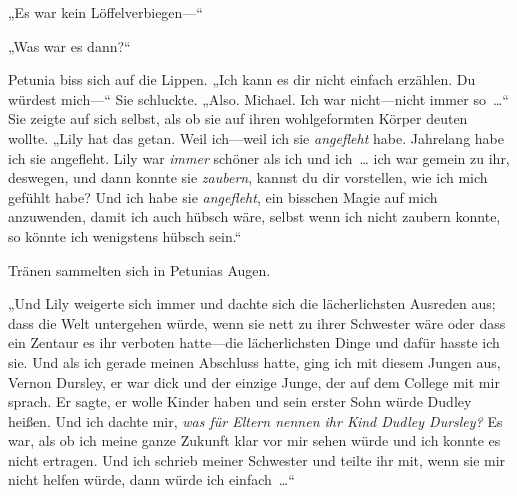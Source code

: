 „Es war kein Löffelverbiegen—“

„Was war es dann?“

Petunia biss sich auf die Lippen. „Ich kann es dir nicht einfach erzählen. Du würdest mich—“ Sie schluckte. „Also. Michael. Ich war nicht—nicht immer so …“ Sie zeigte auf sich selbst, als ob sie auf ihren wohlgeformten Körper deuten wollte. „Lily hat das getan. Weil ich—weil ich sie \emph{angefleht} habe. Jahrelang habe ich sie angefleht. Lily war \emph{immer} schöner als ich und ich … ich war gemein zu ihr, deswegen, und dann konnte sie \emph{zaubern}, kannst du dir vorstellen, wie ich mich gefühlt habe? Und ich habe sie \emph{angefleht}, ein bisschen Magie auf mich anzuwenden, damit ich auch hübsch wäre, selbst wenn ich nicht zaubern konnte, so könnte ich wenigstens hübsch sein.“

Tränen sammelten sich in Petunias Augen.

„Und Lily weigerte sich immer und dachte sich die lächerlichsten Ausreden aus; dass die Welt untergehen würde, wenn sie nett zu ihrer Schwester wäre oder dass ein Zentaur es ihr verboten hatte—die lächerlichsten Dinge und dafür hasste ich sie. Und als ich gerade meinen Abschluss hatte, ging ich mit diesem Jungen aus, Vernon Dursley, er war dick und der einzige Junge, der auf dem College mit mir sprach. Er sagte, er wolle Kinder haben und sein erster Sohn würde Dudley heißen. Und ich dachte mir, \emph{was für Eltern nennen ihr Kind Dudley Dursley?} Es war, als ob ich meine ganze Zukunft klar vor mir sehen würde und ich konnte es nicht ertragen. Und ich schrieb meiner Schwester und teilte ihr mit, wenn sie mir nicht helfen würde, dann würde ich einfach …“

